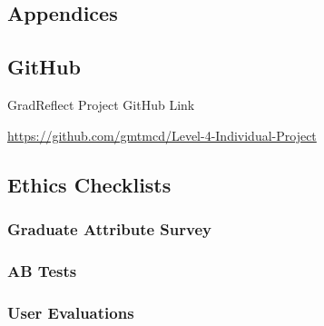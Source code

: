 \documentclass{l4proj}
\begin{document}
%
% 

\begin{appendices}

\chapter{Appendices}

\section{GitHub}\label{AppendixGitHub}

GradReflect Project GitHub Link

\url{https://github.com/gmtmcd/Level-4-Individual-Project}

%

\section{Ethics Checklists}

\subsection{Graduate Attribute Survey}



\subsection{AB Tests}



\subsection{User Evaluations}



%


\end{appendices}
\end{document}
